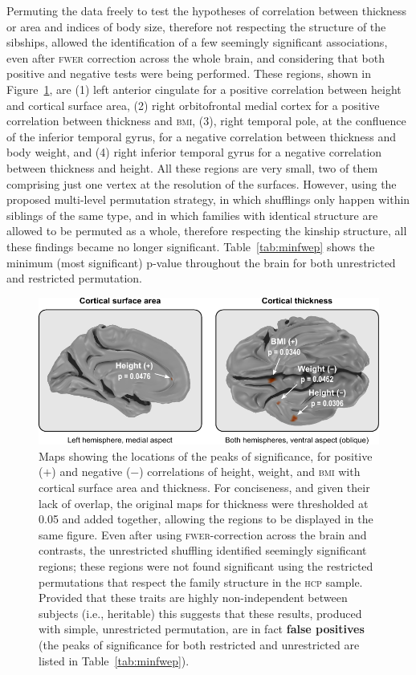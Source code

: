 Permuting the data freely to test the hypotheses of correlation between thickness or area and indices of body size, therefore not respecting the structure of the sibships, allowed the identification of a few seemingly significant associations, even after \textsc{fwer} correction across the whole brain, and considering that both positive and negative tests were being performed. These regions, shown in Figure~\ref{fig:realdata}, are (1) left anterior cingulate for a positive correlation between height and cortical surface area, (2) right orbitofrontal medial cortex for a positive correlation between thickness and \textsc{bmi}, (3), right temporal pole, at the confluence of the inferior temporal gyrus, for a negative correlation between thickness and body weight, and (4) right inferior temporal gyrus for a negative correlation between thickness and height. All these regions are very small, two of them comprising just one vertex at the resolution of the surfaces. However, using the proposed multi-level permutation strategy, in which shufflings only happen within siblings of the same type, and in which families with identical structure are allowed to be permuted as a whole, therefore respecting the kinship structure, all these findings became no longer significant. Table~\ref{tab:minfwep} shows the minimum (most significant) p-value throughout the brain for both unrestricted and restricted permutation.

\begin{figure}[!tp]
\centering
\includegraphics{figures/realdata.pdf}
\caption[Maps showing significant correlations (false positives) of height, weight, and \textsc{bmi} with cortical surface area and thickness.]{Maps showing the locations of the peaks of significance, for positive ($+$) and negative ($-$) correlations of height, weight, and \textsc{bmi} with cortical surface area and thickness. For conciseness, and given their lack of overlap, the original maps for thickness were thresholded at 0.05 and added together, allowing the regions to be displayed in the same figure. Even after using \textsc{fwer}-correction across the brain and contrasts, the unrestricted shuffling identified seemingly significant regions; these regions were not found significant using the restricted permutations that respect the family structure in the \textsc{hcp} sample. Provided that these traits are highly non-independent between subjects (i.e., heritable) this suggests that these results, produced with simple, unrestricted permutation, are in fact \textbf{false positives} (the peaks of significance for both restricted and unrestricted are listed in Table~\ref{tab:minfwep}).}
\label{fig:realdata}
\end{figure}

